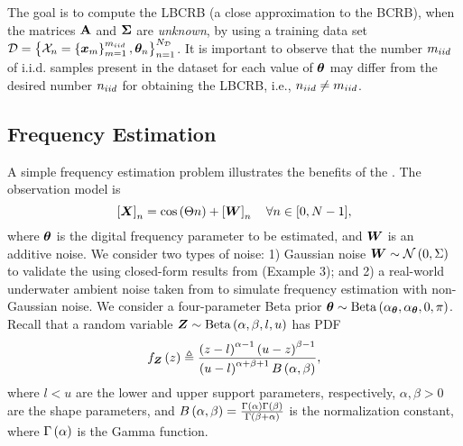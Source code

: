 {The goal is to compute the LBCRB (a close approximation to the BCRB), when the matrices $\mathbf{A}$ and $\mathbf{\Sigma}$ are \emph{unknown}, by using a training data set 
$\mathcal{D}=\set{\mathcal{X}_n=\set{{\bm{x}}_m}_{m=1}^{m_{iid}},\bm{\theta}_n}_{n=1}^{N_{\mathcal{D}}}$. 
 It is important to observe that the number $m_{iid}$ of i.i.d. samples present in the dataset for each value of $\bm{\theta}$ may differ from the desired number $n_{iid}$ for obtaining the LBCRB,
 i.e., $n_{iid} \neq m_{iid}$.



\subsection{Frequency Estimation }\label{sec:freq_est}
A simple frequency estimation problem  illustrates the benefits of the \name{}. 
The observation model is  
\begin{equation}\label{eq:freq_est_model}
    \squareb{\X}_n=\cos{\brackets{\pr n}}+\squareb{\randomvec{W}}_n \quad\forall n \in [0,N-1],
\end{equation}
where $\bm{\theta}$ is the digital  frequency  parameter to be estimated, and $\randomvec{W}$ is an additive noise. 
We consider two types of noise: 1)  Gaussian noise $\randomvec{W}\sim \mathcal{N}\brackets{0,\Sigma}$ to validate the \name{} using closed-form results from \cite{van2007bayesian} (Example 3); and 2) a real-world underwater ambient noise taken from \cite{msg0-ag12-22} to simulate frequency estimation with  non-Gaussian noise. 
We consider a four-parameter Beta prior  $\bm{\theta}\sim\mathrm{Beta}\left(\alpha_{\bm{\theta}},\alpha_{\bm{\theta}},0,\pi\right)$. 
Recall that a random variable $\randomvec{z}\sim\mathrm{Beta}\brackets{\alpha,\beta,l,u}$ has PDF
\begin{equation}
    \probt{z}{\randomvec{z}}\triangleq \frac{\brackets{z-l}^{\alpha-1}\brackets{u-z}^{\beta-1}}{\brackets{u-l}^{\alpha+\beta+1}B\brackets{\alpha,\beta}},
\end{equation}
where  $l<u$ are the lower and upper support parameters, respectively, $\alpha, \beta >0$ are the shape parameters, and $B\left(\alpha,\beta\right)=\frac{\Gamma\left(\alpha\right)\Gamma\left(\beta\right)}{\Gamma\left(\beta+\alpha\right)}$ is the normalization constant, where $\Gamma\left(\alpha\right)$ is the Gamma function. 


}
